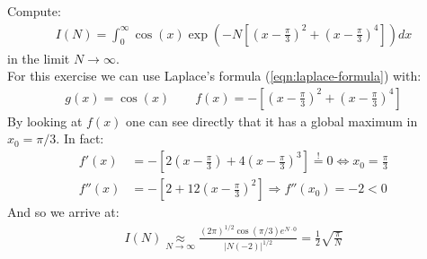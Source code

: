 \documentclass[../template.tex]{subfiles}
\begin{document}
\begin{exo}
    Compute:
\begin{align*}
    I(N) = \int_{0}^{\infty} \cos(x) \exp \left(-N \left[\left(x-\frac{\pi}{3} \right)^2 + \left(x-\frac{\pi}{3} \right)^4\right]\right)dx
\end{align*} 
in the limit $N \to \infty$.\\

For this exercise we can use Laplace's formula (\ref{eqn:laplace-formula}) with:
\begin{align*}
    g(x) = \cos (x) \qquad f(x) = -\left[\left(x-\frac{\pi}{3} \right)^2 + \left(x-\frac{\pi}{3} \right)^4\right]
\end{align*} 
By looking at $f(x)$ one can see directly that it has a global maximum in $x_0 = \pi/3$. In fact:  
\begin{align*}
    f'(x) &= -\left[2\left(x-\frac{\pi}{3} \right) + 4\left(x-\frac{\pi}{3} \right)^3 \right] \overset{!}{=} 0 \Leftrightarrow x_0 = \frac{\pi}{3}\\
    f''(x) &= -\left[2+12\left(x-\frac{\pi}{3} \right)^2\right]  \Rightarrow f''(x_0) = -2 < 0
\end{align*} 
And so we arrive at:
\begin{align*}
    I(N) \underset{N \to \infty}{\approx}  \frac{(2\pi)^{1/2} \cos(\pi/3) e^{N \cdot 0}}{|N(-2)|^{1/2}} = \frac{1}{2} \sqrt{\frac{\pi}{N}}  
\end{align*}
\end{exo}
\end{document}
